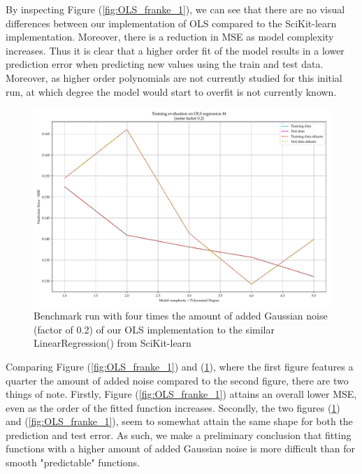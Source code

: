 \documentclass[11pt, a4paper]{article}
\begin{document}
By inspecting Figure (\ref{fig:OLS_franke_1}), we can see that there are no visual differences between our implementation of OLS compared to the SciKit-learn implementation. Moreover, there is a reduction in MSE as model complexity increases. Thus it is clear that a higher order fit of the model results in a lower prediction error when predicting new values using the train and test data. Moreover, as higher order polynomials are not currently studied for this initial run, at which degree the model would start to overfit is not currently known.

\begin{figure}
  \centering
  \includegraphics[scale=0.5]{figures/EX1_franke_function_OLS_evaluate_fit_dn.pdf}
  \caption{\label{fig:OLS_franke_2} Benchmark run with four times the amount of added Gaussian noise (factor of 0.2) of our OLS implementation to the similar LinearRegression() from SciKit-learn}
\end{figure}

Comparing Figure (\ref{fig:OLS_franke_1}) and (\ref{fig:OLS_franke_2}), where the first figure features a quarter the amount of added noise compared to the second figure, there are two things of note. Firstly, Figure (\ref{fig:OLS_franke_1}) attains an overall lower MSE, even as the order of the fitted function increases. Secondly, the two figures (\ref{fig:OLS_franke_2}) and (\ref{fig:OLS_franke_1}), seem to somewhat attain the same shape for both the prediction and test error. As such, we make a preliminary conclusion that fitting functions with a higher amount of added Gaussian noise is more difficult than for smooth "predictable" functions.
\end{document}
